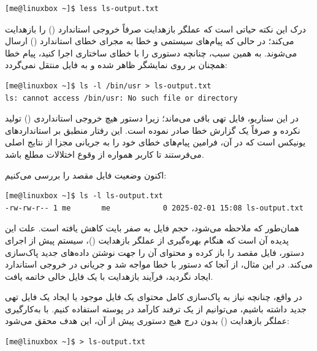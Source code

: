 \begin{latin}
\begin{lstlisting}
[me@linuxbox ~]$ less ls-output.txt
\end{lstlisting}
\end{latin}

درک این نکته حیاتی است که عملگر بازهدایت \cmd{>} صرفاً خروجی استاندارد () را بازهدایت می‌کند؛ در حالی که پیام‌های سیستمی و خطا به مجرای خطای استاندارد () ارسال می‌شوند. به همین سبب، چنانچه دستوری را با خطای ساختاری اجرا کنید، پیام خطا همچنان بر روی نمایشگر ظاهر شده و به فایل منتقل نمی‌گردد:

\begin{latin}
\begin{lstlisting}
[me@linuxbox ~]$ ls -l /bin/usr > ls-output.txt
ls: cannot access /bin/usr: No such file or directory
\end{lstlisting}
\end{latin}

در این سناریو، فایل  تهی باقی می‌ماند؛ زیرا دستور  هیچ خروجی استانداردی () تولید نکرده و صرفاً یک گزارش خطا صادر نموده است. این رفتار منطبق بر استانداردهای یونیکس است که در آن، فرامین پیام‌های خطای خود را به جریانی مجزا از نتایج اصلی می‌فرستند تا کاربر همواره از وقوع اختلالات مطلع باشد.

اکنون وضعیت فایل مقصد را بررسی می‌کنیم:

\begin{latin}
\begin{lstlisting}
[me@linuxbox ~]$ ls -l ls-output.txt
-rw-rw-r-- 1 me       me            0 2025-02-01 15:08 ls-output.txt
\end{lstlisting}
\end{latin}

همان‌طور که ملاحظه می‌شود، حجم فایل به صفر بایت کاهش یافته است. علت این پدیده آن است که هنگام بهره‌گیری از عملگر بازهدایت (\cmd{>})، سیستم پیش از اجرای دستور، فایل مقصد را باز کرده و محتوای آن را جهت نوشتن داده‌های جدید پاک‌سازی می‌کند. در این مثال، از آنجا که دستور با خطا مواجه شد و جریانی در خروجی استاندارد ایجاد نگردید، فرآیند بازهدایت با یک فایل خالی خاتمه یافت.

در واقع، چنانچه نیاز به پاک‌سازی کامل محتوای یک فایل موجود یا ایجاد یک فایل تهی جدید داشته باشیم، می‌توانیم از یک ترفند کارآمد در پوسته استفاده کنیم. با به‌کارگیری عملگر بازهدایت (\cmd{>}) بدون درج هیچ دستوری پیش از آن، این هدف محقق می‌شود:

\begin{latin}
\begin{lstlisting}
[me@linuxbox ~]$ > ls-output.txt
\end{lstlisting}
\end{latin}

